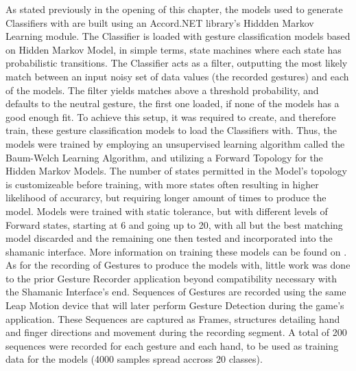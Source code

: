     \clearpage
    
    As stated previously in the opening of this chapter, the models used to generate Classifiers with are built using an Accord.NET library's Hiddden Markov Learning module. The Classifier is loaded with gesture classification models based on Hidden Markov Model, in simple terms, state machines where each state has probabilistic transitions. The Classifier acts as a filter, outputting the most likely match between an input noisy set of data values (the recorded gestures) and each of the models. The filter yields matches above a threshold probability, and defaults to the neutral gesture, the first one loaded, if none of the models has a good enough fit. To achieve this setup, it was required to create, and therefore train, these gesture classification models to load the Classifiers with. Thus, the models were trained by employing an unsupervised learning algorithm called the Baum-Welch Learning Algorithm, and utilizing a Forward Topology for the Hidden Markov Models. The number of states permitted in the Model's topology is customizeable before training, with more states often resulting in higher likelihood of accurarcy, but requiring longer amount of times to produce the model. Models were trained with static tolerance, but with different levels of Forward states, starting at 6 and going up to 20, with all but the best matching model discarded and the remaining one then tested and incorporated into the shamanic interface. More information on training these models can be found on \cite{classHMMAlgorithms}.\\

    As for the recording of Gestures to produce the models with, little work was done to the prior Gesture Recorder application beyond compatibility necessary with the Shamanic Interface’s end. Sequences of Gestures are recorded using the same Leap Motion device that will later perform Gesture Detection during the game’s application. These Sequences are captured as Frames, structures detailing hand and finger directions and movement during the recording segment. A total of 200 sequences were recorded for each gesture and each hand, to be used as training data for the models (4000 samples spread accross 20 classes).
